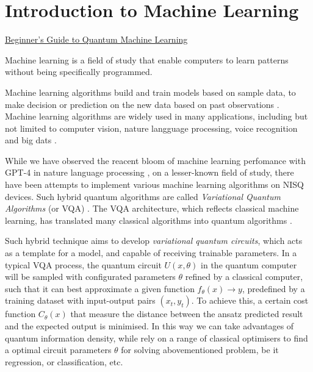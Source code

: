 \section{Introduction to Machine Learning} \label{Sec: Introduction to Machine Learning}

\href{https://blog.paperspace.com/beginners-guide-to-quantum-machine-learning/}{Beginner's Guide to Quantum Machine Learning}

\cite{kaurIntroductionMachineLearning2021}

Machine learning is a field of study that enable computers to learn patterns without being specifically programmed.

Machine learning algorithms build and train models based on sample data, to make decision or prediction on the new data based on past observations \cite{kozaAutomatedDesignBoth1996}.
Machine learning algorithms are widely used in many applications, including but not limited to computer vision, nature langguage processing, voice recognition and big dats \cite{khanMachineLearningComputer2020, zhangNaturalLanguageProcessing2021,tandelVoiceRecognitionVoice2020,elbouchefryLearningBigData2020, shindeReviewMachineLearning2018}.

While we have observed the reacent bloom of machine learning perfomance with GPT-4 in nature language processing \cite{openaiGPT4TechnicalReport2023}, on a lesser-known field of study, there have been attempts to implement various machine learning algorithms on NISQ devices.
Such hybrid quantum algorithms are called \emph{Variational Quantum Algorithms} (or VQA) \cite{cerezoVariationalQuantumAlgorithms2021}.
The VQA architecture, which reflects classical machine learning, has translated many classical algorithms into quantum algorithms \cite{zoufalVariationalQuantumBoltzmann2021a, tillyVariationalQuantumEigensolver2021a}.

Such hybrid technique aims to develop \emph{variational quantum circuits}, which acts as a template for a model, and capable of receiving trainable parameters.
In a typical VQA process, the quantum circuit $U(x, \theta)$ in the quantum computer will be sampled with configurated parameters $\theta$ refined by a classical computer, such that it can best approximate a given function ${f_\theta(x) \rightarrow y}$, predefined by a training dataset with input-output pairs $(x_t, y_t)$.
To achieve this, a certain cost function ${C_\theta(x)}$ that measure the distance between the ansatz predicted result and the expected output is minimised.
In this way we can take advantages of quantum information density, while rely on a range of classical optimisers to find a optimal circuit parameters $\theta$ for solving abovementioned problem, be it regression, or classification, etc.

